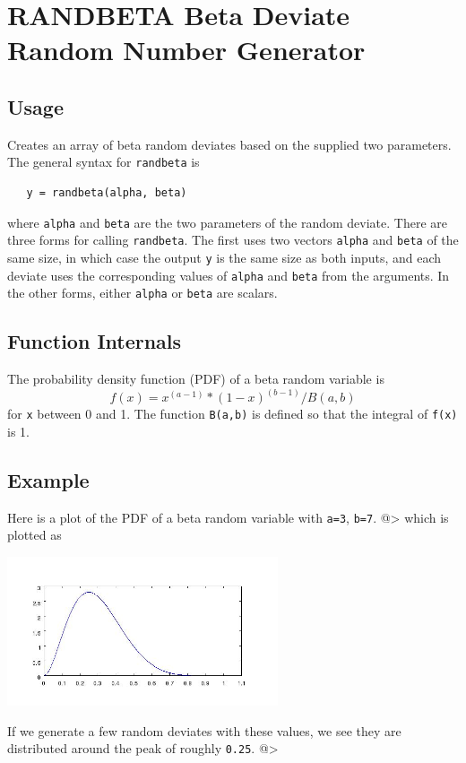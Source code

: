 \section{RANDBETA Beta Deviate Random Number Generator}

\subsection{Usage}

Creates an array of beta random deviates based on the supplied
two parameters. The general syntax for \verb|randbeta| is 
\begin{verbatim}
   y = randbeta(alpha, beta)
\end{verbatim}
where \verb|alpha| and \verb|beta| are the two parameters of the 
random deviate.  There are three forms for calling \verb|randbeta|.
The first uses two vectors \verb|alpha| and \verb|beta| of the same
size, in which case the output \verb|y| is the same size as both
inputs, and each deviate uses the corresponding values of \verb|alpha|
and \verb|beta| from the arguments.  In the other forms, either
\verb|alpha| or \verb|beta| are scalars.
\subsection{Function Internals}

The probability density function (PDF) of a beta random variable
is
\[
f(x) = x^(a-1) * (1-x)^(b-1) / B(a,b)
\]
for \verb|x| between 0 and 1.  The function \verb|B(a,b)| is defined so
that the integral of \verb|f(x)| is 1.
\subsection{Example}

Here is a plot of the PDF of a beta random variable with \verb|a=3|,
\verb|b=7|.
@>
which is plotted as


\centerline{\includegraphics[width=8cm]{betapdf}}

If we generate a few random deviates with these values,
we see they are distributed around the peak of roughly
\verb|0.25|.
@>
